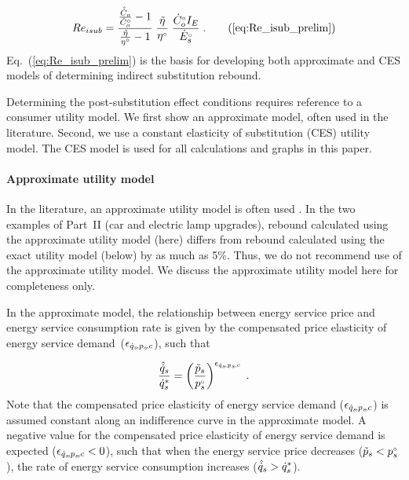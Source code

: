 \begin{equation}
  Re_{isub} = \frac{\frac{\rasub{C}_o}{\rorig{C}_o} - 1}{\etaratiostacked - 1} \; 
                          \etaratiostacked \; 
                          \frac{\rbempl{C}_o I_E}{\rbempl{E}_s} \; .
                              \tag{\ref{eq:Re_isub_prelim}}
\end{equation}
%
Eq.~(\ref{eq:Re_isub_prelim}) is the basis for
developing both approximate and CES models of determining
indirect substitution rebound.

Determining the post-substitution effect conditions
requires reference to a consumer utility model.
We first show an approximate model, often used in the literature. 
Second, we use a constant elasticity of substitution (CES)
utility model. 
The CES model is used for all calculations and graphs in this paper.


\paragraph{Approximate utility model} 
\label{sec:Resub_approximate_method}

In the literature, an approximate utility model is often used 
\citep[p.~17, footnote~43]{Borenstein:2015aa}.
In the two examples of Part~II (car and electric lamp upgrades),
rebound calculated using the approximate utility model (here)
differs from rebound calculated using the exact utility model (below) 
by as much as 5\%.
Thus, we do not recommend use of the approximate utility model.
We discuss the approximate utility model here for completeness only.

In the approximate model, 
the relationship between energy service price and energy service consumption rate
is given by the compensated price elasticity of energy service demand~($\epsilon_{\dot{q}_s\!,p_s\!,c}$),
such that

\begin{equation}
  \frac{\hat{\dot{q}}_s}{{\dot{q}}^*_s} = \left( \frac{\tilde{p}_s}{{}{p}^{\scriptscriptstyle \circ}_s} \right)^{\epsilon_{\dot{q}_s\!,p_s\!,c}} \; .
\end{equation}
%
Note that the compensated price elasticity of energy service demand ($\epsilon_{\dot{q}_s\!,p_s\!,c}$)
is assumed constant along an indifference curve
in the approximate model. 
A negative value for the compensated price elasticity of energy service demand
is expected ($\epsilon_{\dot{q}_s\!,p_s\!,c} < 0$),
such that when the energy service price decreases ($\tilde{p}_s < {}{p}^{\scriptscriptstyle \circ}_s$),
the rate of energy service consumption increases ($\hat{\dot{q}}_s > {\dot{q}}^*_s$).

